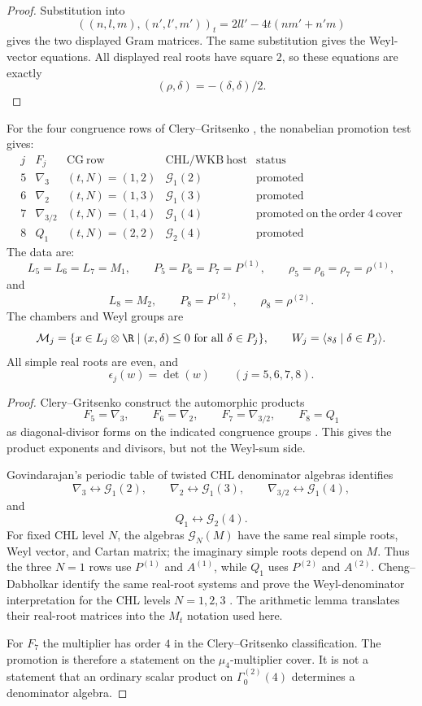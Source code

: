 \begin{proof}
Substitution into
$$
((n,l,m),(n',l',m'))_t=2ll'-4t(nm'+n'm)
$$
gives the two displayed Gram matrices.  The same substitution gives
the Weyl-vector equations.  All displayed real roots have square $2$,
so these equations are exactly
$$
(\rho,\delta)=-(\delta,\delta)/2.
$$
\end{proof}

\begin{proposition}
For the four congruence rows of Clery--Gritsenko \cite{GC}, the
nonabelian promotion test gives:
$$
\begin{array}{c|c|c|c|c}
j&F_j&\mathrm{CG\ row}&\mathrm{CHL/WKB\ host}&\mathrm{status}\\ \hline
5&\nabla_3&(t,N)=(1,2)&\mathcal G_1(2)&\mathrm{promoted}\\
6&\nabla_2&(t,N)=(1,3)&\mathcal G_1(3)&\mathrm{promoted}\\
7&\nabla_{3/2}&(t,N)=(1,4)&\mathcal G_1(4)&
\mathrm{promoted\ on\ the\ order\ }4\ \mathrm{cover}\\
8&Q_1&(t,N)=(2,2)&\mathcal G_2(4)&\mathrm{promoted}
\end{array}
$$
The data are:
$$
L_5=L_6=L_7=M_1,\qquad
P_5=P_6=P_7=P^{(1)},\qquad
\rho_5=\rho_6=\rho_7=\rho^{(1)},
$$
and
$$
L_8=M_2,\qquad P_8=P^{(2)},\qquad \rho_8=\rho^{(2)}.
$$
The chambers and Weyl groups are
$$
\mathcal M_j=\{x\in L_j\otimes\R\mid(x,\delta)\leq0
\hbox{ for all }\delta\in P_j\},
\qquad
W_j=\langle s_\delta\mid\delta\in P_j\rangle.
$$
All simple real roots are even, and
$$
\epsilon_j(w)=\det(w)\qquad(j=5,6,7,8).
$$
\end{proposition}

\begin{proof}
Clery--Gritsenko construct the automorphic products
$$
F_5=\nabla_3,\qquad F_6=\nabla_2,\qquad
F_7=\nabla_{3/2},\qquad F_8=Q_1
$$
as diagonal-divisor forms on the indicated congruence groups
\cite{GC}.  This gives the product exponents and divisors, but not the
Weyl-sum side.

Govindarajan's periodic table of twisted CHL denominator algebras
\cite{Gov11BKM} identifies
$$
\nabla_3\leftrightarrow\mathcal G_1(2),\qquad
\nabla_2\leftrightarrow\mathcal G_1(3),\qquad
\nabla_{3/2}\leftrightarrow\mathcal G_1(4),
$$
and
$$
Q_1\leftrightarrow\mathcal G_2(4).
$$
For fixed CHL level $N$, the algebras $\mathcal G_N(M)$ have the same
real simple roots, Weyl vector, and Cartan matrix; the imaginary simple
roots depend on $M$.  Thus the three $N=1$ rows use $P^{(1)}$ and
$A^{(1)}$, while $Q_1$ uses $P^{(2)}$ and $A^{(2)}$.
Cheng--Dabholkar identify the same real-root systems and prove the
Weyl-denominator interpretation for the CHL levels $N=1,2,3$
\cite{CD09BKM}.  The arithmetic lemma translates their real-root
matrices into the $M_t$ notation used here.

For $F_7$ the multiplier has order $4$ in the Clery--Gritsenko
classification.  The promotion is therefore a statement on the
$\mu_4$-multiplier cover.  It is not a statement that an ordinary
scalar product on $\Gamma_0^{(2)}(4)$ determines a denominator algebra.
\end{proof}

